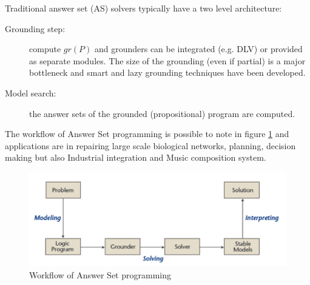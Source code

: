 Traditional answer set (AS) solvers typically have a two level architecture:
\begin{description}
   \item [Grounding step: ] compute $gr(P)$ and grounders can be integrated (e.g. DLV)
	                    or provided as separate modules.\newline
           The size of the grounding (even if partial) is a major bottleneck and 
	   smart and lazy grounding techniques have been developed.
   \item [Model search: ] the answer sets of the grounded (propositional) program are computed.
\end{description}
The workflow of Answer Set programming is possible to note in figure \ref{img:answerSolver} and
applications are in repairing large scale biological networks, planning, decision making
but also Industrial integration and Music composition system.

\begin{figure}
	\includegraphics[width=\textwidth]{Images/answerSolver}
	\caption{Workflow of Answer Set programming}
	\label{img:answerSolver}
\end{figure}
